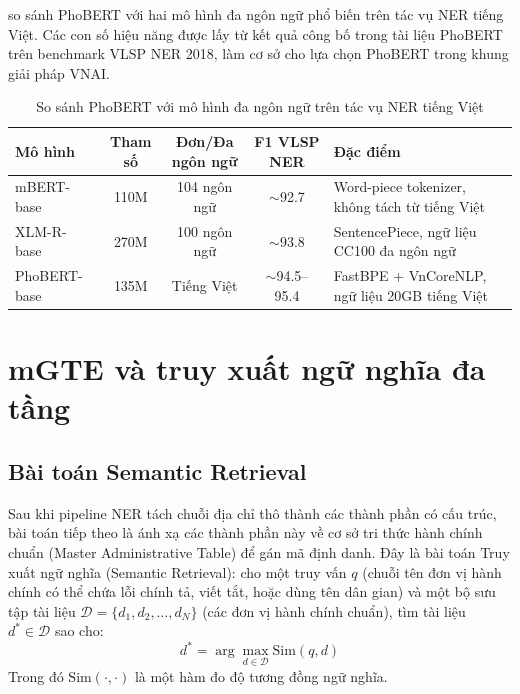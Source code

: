  so sánh PhoBERT với hai mô hình đa ngôn ngữ phổ biến trên tác vụ NER tiếng Việt. Các con số hiệu năng được lấy từ kết quả công bố trong tài liệu PhoBERT \cite{nguyen2020phobert} trên benchmark VLSP NER 2018, làm cơ sở cho lựa chọn PhoBERT trong khung giải pháp VNAI.

\begin{table}[h]
\centering
\caption{So sánh PhoBERT với mô hình đa ngôn ngữ trên tác vụ NER tiếng Việt}
\label{tab:so-sanh-phobert}
\small
\begin{tabularx}{\linewidth}{>{\raggedright\arraybackslash}p{2.6cm} c c c >{\raggedright\arraybackslash}X}
\toprule
\textbf{Mô hình} & \textbf{Tham số} & \textbf{Đơn/Đa ngôn ngữ} & \textbf{F1 VLSP NER} & \textbf{Đặc điểm} \\
\midrule
mBERT-base   & 110M & 104 ngôn ngữ & $\sim$92.7 & Word-piece tokenizer, không tách từ tiếng Việt \\
XLM-R-base   & 270M & 100 ngôn ngữ & $\sim$93.8 & SentencePiece, ngữ liệu CC100 đa ngôn ngữ \\
PhoBERT-base & 135M & Tiếng Việt    & $\sim$94.5--95.4 & FastBPE + VnCoreNLP, ngữ liệu 20GB tiếng Việt \\
\bottomrule
\end{tabularx}
\end{table}

\section{mGTE và truy xuất ngữ nghĩa đa tầng}
\label{sec:mgte}

\subsection{Bài toán Semantic Retrieval}

Sau khi pipeline NER tách chuỗi địa chỉ thô thành các thành phần có cấu trúc, bài toán tiếp theo là ánh xạ các thành phần này về cơ sở tri thức hành chính chuẩn (Master Administrative Table) để gán mã định danh. Đây là bài toán Truy xuất ngữ nghĩa (Semantic Retrieval): cho một truy vấn $q$ (chuỗi tên đơn vị hành chính có thể chứa lỗi chính tả, viết tắt, hoặc dùng tên dân gian) và một bộ sưu tập tài liệu $\mathcal{D} = \{d_1, d_2, \dots, d_N\}$ (các đơn vị hành chính chuẩn), tìm tài liệu $d^* \in \mathcal{D}$ sao cho:
\begin{equation}
d^* = \arg\max_{d \in \mathcal{D}} \mathrm{Sim}(q, d)
\label{eq:retrieval}
\end{equation}
Trong đó $\mathrm{Sim}(\cdot, \cdot)$ là một hàm đo độ tương đồng ngữ nghĩa.

